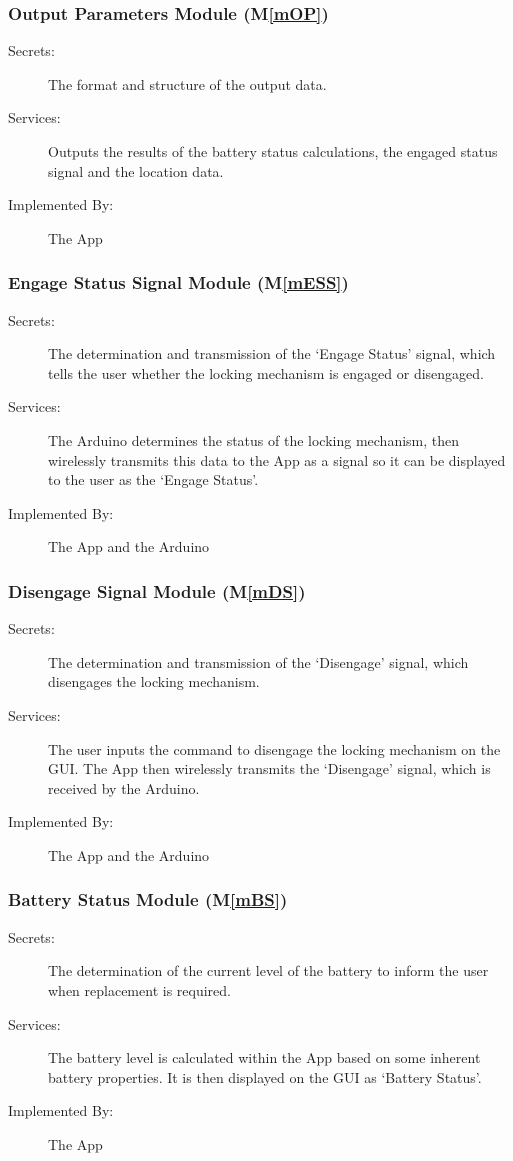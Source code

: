 \documentclass[12pt, titlepage]{article}
\newcommand{\mref}[1]{M\ref{#1}}
\begin{document}
\subsubsection{Output Parameters Module (\mref{mOP})}
\begin{description}
\item[Secrets:]The format and structure of the output data.
\item[Services:]Outputs the results of the battery status calculations, the engaged status signal and the location data. 
\item[Implemented By:]The App
\end{description}

\subsubsection{Engage Status Signal Module (\mref{mESS})}
\begin{description}
\item[Secrets:]The determination and transmission of the ‘Engage Status’ signal, which tells the user whether the locking mechanism is engaged or disengaged.
\item[Services:]The Arduino determines the status of the locking mechanism, then wirelessly transmits this data to the App as a signal so it can be displayed to the user as the ‘Engage Status’.
\item[Implemented By:]The App and the Arduino
\end{description}

\subsubsection{Disengage Signal Module (\mref{mDS})}
\begin{description}
\item[Secrets:]The determination and transmission of the ‘Disengage’ signal, which disengages the locking mechanism. 
\item[Services:]The user inputs the command to disengage the locking mechanism on the GUI. The App then wirelessly transmits the ‘Disengage’ signal, which is received by the Arduino. 
\item[Implemented By:]The App and the Arduino
\end{description}

\subsubsection{Battery Status Module (\mref{mBS})}
\begin{description}
\item[Secrets:]The determination of the current level of the battery to inform the user when replacement is required.
\item[Services:]The battery level is calculated within the App based on some inherent battery properties. It is then displayed on the GUI as ‘Battery Status’. 
\item[Implemented By:]The App
\end{description}
\end{document}
